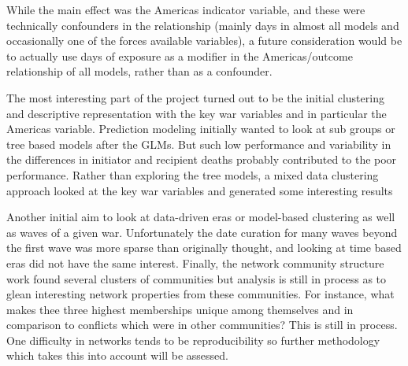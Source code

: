\documentclass[
]{article}
\begin{document}
While the main effect was the Americas indicator variable, and these
were technically confounders in the relationship (mainly days in almost
all models and occasionally one of the forces available variables), a
future consideration would be to actually use days of exposure as a
modifier in the Americas/outcome relationship of all models, rather than
as a confounder.

The most interesting part of the project turned out to be the initial
clustering and descriptive representation with the key war variables and
in particular the Americas variable. Prediction modeling initially
wanted to look at sub groups or tree based models after the GLMs. But
such low performance and variability in the differences in initiator and
recipient deaths probably contributed to the poor performance. Rather
than exploring the tree models, a mixed data clustering approach looked
at the key war variables and generated some interesting results

Another initial aim to look at data-driven eras or model-based
clustering as well as waves of a given war. Unfortunately the date
curation for many waves beyond the first wave was more sparse than
originally thought, and looking at time based eras did not have the same
interest. Finally, the network community structure work found several
clusters of communities but analysis is still in process as to glean
interesting network properties from these communities. For instance,
what makes thee three highest memberships unique among themselves and in
comparison to conflicts which were in other communities? This is still
in process. One difficulty in networks tends to be reproducibility so
further methodology which takes this into account will be assessed.
\end{document}
